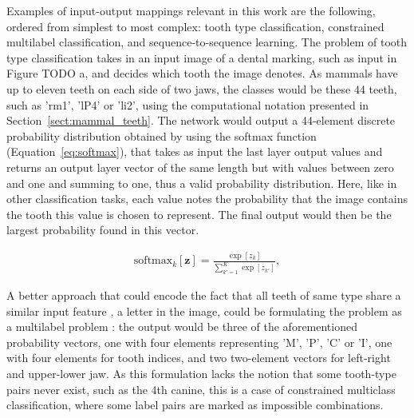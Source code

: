 \documentclass{article}
\begin{document}
Examples of input-output mappings relevant in this work are the following, 
ordered from simplest to most complex: tooth type classification, constrained multilabel classification, 
and sequence-to-sequence learning. The problem of tooth type classification takes in an input image of a dental marking,
such as input in Figure TODO a, and decides which tooth the image denotes.
As mammals have up to eleven teeth on each side of two jaws, the classes would be 
these 44 teeth, such as 'rm1', 'lP4' or 'li2', using the computational notation presented in
Section~\ref{sect:mammal_teeth}. The network would output a 44-element discrete probability distribution 
obtained by using the softmax function (Equation~\ref{eq:softmax}), that takes as input the last layer output
values and returns an output layer vector of the same length but with values between zero and one and summing to one, 
thus a valid probability distribution.
Here, like in other classification tasks, each value notes the probability that the image contains 
the tooth this value is chosen to represent. The final output would then be the largest probability
found in this vector.

\begin{align}
    \text{softmax}_k[\mathbf{z}] = \frac{\exp[z_k]}{\sum_{k'=1}^{K} \exp[z_{k'}]},
    \label{eq:softmax}
\end{align}

A better approach that could encode the fact that all teeth of same type share a similar input feature
, a letter in the image, could be formulating the problem as a multilabel
problem \cite{multilabel_classification}: the output would be three of the aforementioned 
probability vectors, one with four elements representing 'M', 'P', 'C' or 'I', one with four elements 
for tooth indices, and two two-element vectors for left-right and upper-lower jaw. As this 
formulation lacks the notion that some tooth-type pairs never exist, such as the 4th canine,
this is a case of constrained multiclass classification, where some label pairs are marked 
as impossible combinations.
\end{document}
